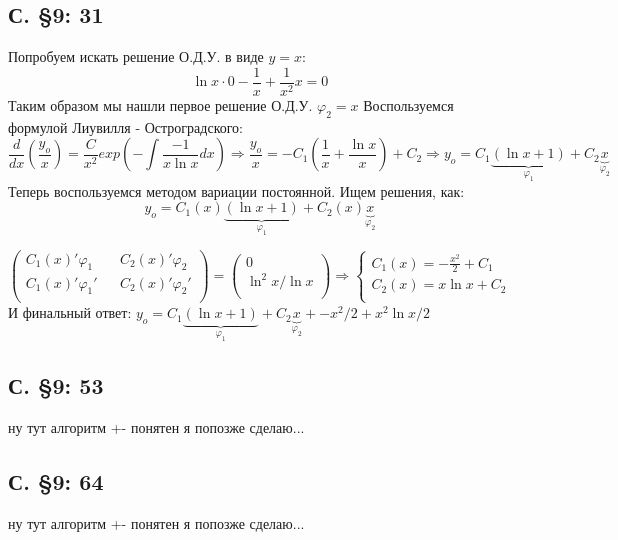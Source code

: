\documentclass{article}
\begin{document}
\subsection{С. \S9: 31 }
Попробуем искать решение О.Д.У. в виде $y=x$:
\begin{equation*}
    \ln x \cdot 0 - \frac{1}{x} + \frac{1}{x^2} x = 0
\end{equation*}
Таким образом мы нашли первое решение О.Д.У. $\varphi_2=x$ Воспользуемся формулой Лиувилля - Остроградского:
\begin{equation}
    \frac{d}{d x} \left( \frac{y_o}{x}\right) = \frac{C}{x^2} exp \left( -\int \frac{-1}{x \ln x} dx  \right) \Rightarrow 
    \frac{y_o}{x} = -C_1 \left(\frac{1}{x} + \frac{\ln x}{x}\right) + C_2 \Rightarrow 
    y_o = C_1\underbrace{(\ln x + 1)}_{\varphi_1} + C_2\underbrace{ x}_{\varphi_2} 
\end{equation}
Теперь воспользуемся методом вариации постоянной. Ищем решения, как:
\begin{equation*}
    y_o = C_1(x)\underbrace{(\ln x + 1)}_{\varphi_1} + C_2(x)\underbrace{ x}_{\varphi_2}
\end{equation*}

\begin{equation}
    \begin{pmatrix}
    C_1(x)' \varphi_1 && C_2(x)' \varphi_2 \\
    C_1(x)' \varphi_1' && C_2(x)' \varphi_2' \\
    \end{pmatrix}
    =
    \begin{pmatrix}
    0\\
    \ln^2 x / \ln x \\
    \end{pmatrix}
    \Rightarrow
    \begin{cases}
    C_1(x)=-\frac{x^2}{2}+C_1\\
    C_2(x)=x \ln x + C_2\\
    \end{cases}
\end{equation}
И финальный ответ: $y_o = C_1\underbrace{(\ln x + 1)}_{\varphi_1} + C_2\underbrace{ x}_{\varphi_2}  + 
 - x^2/2+x^2 \ln x /2$
\subsection{С. \S9: 53 }
ну тут алгоритм +- понятен я попозже сделаю...
\subsection{С. \S9: 64 }
ну тут алгоритм +- понятен я попозже сделаю...
\end{document}
